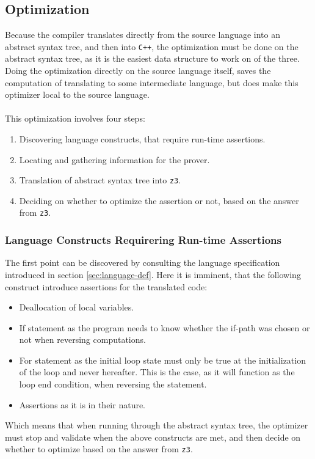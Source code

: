 \subsection{Optimization \rr}
Because the compiler translates directly from the source language into an abstract syntax tree,
and then into \texttt{C++}, the optimization must be done on the abstract syntax tree, as it is
the easiest data structure to work on of the three. Doing the optimization directly on the source
language itself, saves the computation of translating to some intermediate language, but does
make this optimizer local to the source language.
\\
\\
This optimization involves four steps:
\begin{enumerate}
    \item Discovering language constructs, that require run-time assertions.
    \item Locating and gathering information for the prover.
    \item Translation of abstract syntax tree into \texttt{z3}.
    \item Deciding on whether to optimize the assertion or not, based on the answer
          from \texttt{z3}.
\end{enumerate}

\subsubsection{Language Constructs Requirering Run-time Assertions \rr}
The first point can be discovered by consulting the language specification introduced
in section \ref{sec:language-def}. Here it is imminent, that the following construct introduce
assertions for the translated code:
\begin{itemize} %
    \item Deallocation of local variables.
    \item If statement as the program needs to know whether the if-path was chosen or not when
          reversing computations.

    \item For statement as the initial loop state must only be true at the initialization of the
          loop and never hereafter. This is the case, as it will function as the loop end
          condition, when reversing the statement.

    \item Assertions as it is in their nature.
\end{itemize}
\noindent
Which means that when running through the abstract syntax tree, the optimizer must stop and validate
when the above constructs are met, and then decide on whether to optimize based on the answer from
\texttt{z3}.

